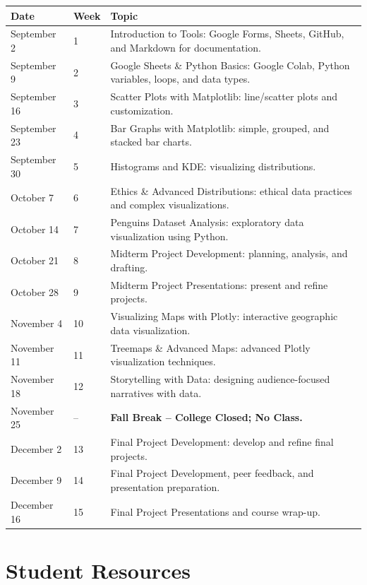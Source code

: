 \documentclass{exam}
\begin{document}
\begin{longtable}{|l|l|p{10cm}|}
\hline
\textbf{Date} & \textbf{Week} & \textbf{Topic} \\ \hline
September 2  & 1  & Introduction to Tools: Google Forms, Sheets, GitHub, and Markdown for documentation. \\ \hline
September 9  & 2  & Google Sheets \& Python Basics: Google Colab, Python variables, loops, and data types. \\ \hline
September 16 & 3  & Scatter Plots with Matplotlib: line/scatter plots and customization. \\ \hline
September 23 & 4  & Bar Graphs with Matplotlib: simple, grouped, and stacked bar charts. \\ \hline
September 30 & 5  & Histograms and KDE: visualizing distributions. \\ \hline
October 7    & 6  & Ethics \& Advanced Distributions: ethical data practices and complex visualizations. \\ \hline
October 14   & 7  & Penguins Dataset Analysis: exploratory data visualization using Python. \\ \hline
October 21   & 8  & Midterm Project Development: planning, analysis, and drafting. \\ \hline
October 28   & 9  & Midterm Project Presentations: present and refine projects. \\ \hline
November 4   & 10 & Visualizing Maps with Plotly: interactive geographic data visualization. \\ \hline
November 11  & 11 & Treemaps \& Advanced Maps: advanced Plotly visualization techniques. \\ \hline
November 18  & 12 & Storytelling with Data: designing audience-focused narratives with data. \\ \hline
November 25  & -- & \textbf{Fall Break -- College Closed; No Class.} \\ \hline
December 2   & 13 & Final Project Development: develop and refine final projects. \\ \hline
December 9   & 14 & Final Project Development, peer feedback, and presentation preparation. \\ \hline
December 16  & 15 & Final Project Presentations and course wrap-up. \\ \hline
\end{longtable}

\section*{Student Resources}
\end{document}
